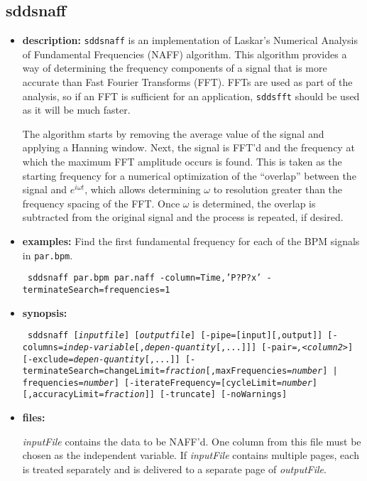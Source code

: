 \newpage
\subsection{sddsnaff}
\label{sddsnaff}

\begin{itemize}
\item {\bf description:}
{\tt sddsnaff} is an implementation of Laskar's Numerical Analysis of Fundamental
Frequencies (NAFF) algorithm.  This algorithm provides a way of determining the frequency
components of a signal that is more accurate than Fast Fourier Transforms (FFT). 
FFTs are used as part of the analysis, so if an FFT is sufficient for an application,
{\tt sddsfft} should be used as it will be much faster.

The algorithm starts by removing the average value of the signal and
applying a Hanning window.  Next, the signal is FFT'd and the
frequency at which the maximum FFT amplitude occurs is found.  This is
taken as the starting frequency for a numerical optimization of the
``overlap'' between the signal and $e^{i\omega t}$, which allows
determining $\omega$ to resolution greater than the frequency spacing
of the FFT.  Once $\omega$ is determined, the overlap is subtracted
from the original signal and the process is repeated, if desired.

\item {\bf examples:} 
Find the first fundamental frequency for each of the BPM signals in {\tt par.bpm}.
\begin{flushleft}{\tt
sddsnaff par.bpm par.naff -column=Time,'P?P?x' -terminateSearch=frequencies=1
}\end{flushleft}
\item {\bf synopsis:} 
\begin{flushleft}{\tt
sddsnaff [{\em inputfile}] [{\em outputfile}]
[-pipe=[input][,output]]
[-columns={\em indep-variable}[,{\em depen-quantity}[,...]]] 
[-pair={\em<column1>,<column2>}]
[-exclude={\em depen-quantity}[,...]]
[-terminateSearch={changeLimit={\em fraction}[,maxFrequencies={\em number}] | frequencies={\em number}}]
[-iterateFrequency=[cycleLimit={\em number}][,accuracyLimit={\em fraction}]]
[-truncate] [-noWarnings]
}\end{flushleft}
\item {\bf files:}

{\em inputFile} contains the data to be NAFF'd.  One column from this
file must be chosen as the independent variable.  If {\em inputFile}
contains multiple pages, each is treated separately and is delivered
to a separate page of {\em outputFile}.


\end{itemize}

